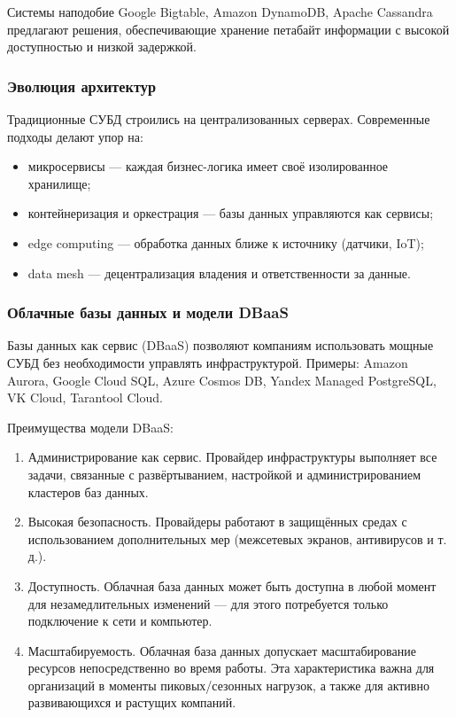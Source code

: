 Системы наподобие Google Bigtable, Amazon DynamoDB, Apache Cassandra предлагают решения, обеспечивающие хранение петабайт информации с высокой доступностью и низкой задержкой.

\subsubsection{Эволюция архитектур}

Традиционные СУБД строились на централизованных серверах. Современные подходы делают упор на:
\begin{itemize}
	\item микросервисы — каждая бизнес-логика имеет своё изолированное хранилище;
	\item контейнеризация и оркестрация — базы данных управляются как сервисы;
	\item edge computing — обработка данных ближе к источнику (датчики, IoT);
	\item data mesh — децентрализация владения и ответственности за данные.
\end{itemize}

\subsubsection{Облачные базы данных и модели DBaaS}

Базы данных как сервис (DBaaS) позволяют компаниям использовать мощные СУБД без необходимости управлять инфраструктурой. Примеры: Amazon Aurora, Google Cloud SQL, Azure Cosmos DB, Yandex Managed PostgreSQL, VK Cloud, Tarantool Cloud.

Преимущества модели DBaaS:
\begin{enumerate}
	\item Администрирование как сервис. Провайдер инфраструктуры выполняет все задачи, связанные с развёртыванием, настройкой и администрированием кластеров баз данных. 
	\item Высокая безопасность. Провайдеры работают в защищённых средах с использованием дополнительных мер (межсетевых экранов, антивирусов и т. д.).
	\item Доступность. Облачная база данных может быть доступна в любой момент для незамедлительных изменений — для этого потребуется только подключение к сети и компьютер.
	\item Масштабируемость. Облачная база данных допускает масштабирование ресурсов непосредственно во время работы. Эта характеристика важна для организаций в моменты пиковых/сезонных нагрузок, а также для активно развивающихся и растущих компаний. 
\end{enumerate}

